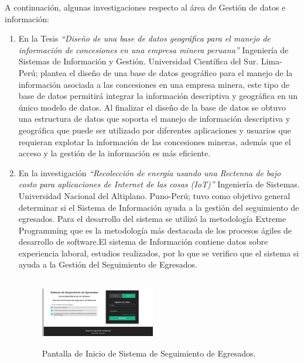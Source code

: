 \documentclass[10pt,conference]{IEEEtran}
\begin{document}
A continuación, algunas investigaciones respecto al área de Gestión de datos e información:
\begin{enumerate}
\item En la Tesis \textit{“Diseño de una base de datos geográfica para el manejo de información de concesiones en una empresa minera peruana”} Ingeniería de Sistemas de Información y Gestión.  Universidad Científica del Sur. Lima-Perú; \citep{palomino} plantea el diseño de una base de datos geográfico para el manejo de la información asociada a las concesiones en una empresa minera, este tipo de base de datos permitirá integrar la información descriptiva y geográfica en un único modelo de datos.  Al finalizar el diseño de la base de datos se obtuvo una estructura de datos que soporta el manejo de información descriptiva y geográfica que puede ser utilizado por diferentes aplicaciones y usuarios que requieran explotar la información de las concesiones mineras, además que el acceso y la gestión de la información es más eficiente.
\item En la investigación \textit{“Recolección de energía usando una Rectenna de bajo costo para aplicaciones de Internet de las cosas (IoT)”} Ingeniería de Sistemas. Universidad Nacional del Altiplano. Puno-Perú; \citep{condori} tuvo como objetivo general determinar si el Sistema de Información ayuda a la gestión del seguimiento de egresados. Para el desarrollo del sistema se utilizó la metodología Extreme Programming que es la metodología más destacada de los procesos ágiles de desarrollo de software.El sistema de Información contiene datos sobre experiencia laboral, estudios realizados, por lo que se verifico que el sistema si ayuda a la Gestión del Seguimiento de Egresados.
\begin{figure}[H]
 \begin{center}
       \includegraphics[width=5cm, height=3cm]{figuras/4.JPG}
      \caption{Pantalla de Inicio de Sistema de Seguimiento de Egresados.}
      \label{f4} 
      \end{center}
\end{figure}

\end{enumerate}
\end{document}
